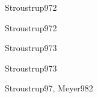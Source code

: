 \begin{syllabus}
\begin{unit}{\PFFOURDef}{Stroustrup97}{2}
\begin{learningoutcomes}
   \end{learningoutcomes}
\end{unit}

\begin{unit}{\PFFIVEDef}{Stroustrup97}{2}
   \PFFIVEAllTopics
   \PFFIVEAllObjectives
\end{unit}

\begin{unit}{\ALONEDef}{Stroustrup97}{3}
   \begin{topics}
      \item \ALONETopicAnalisis
      \item \ALONETopicIdentificar
   \end{topics}
   \begin{learningoutcomes}
      \item \ALONEObjTHREE
   \end{learningoutcomes}
\end{unit}

\begin{unit}{\ALTHREEDef}{Stroustrup97}{3}
   \begin{topics}
      \item \ALTHREETopicAlgoritmos
      \item \ALTHREETopicBusqueda
      \item \ALTHREETopicRepresentacion
      \item \ALTHREETopicOrdenamiento
   \end{topics}
   \begin{learningoutcomes}
      \item \ALTHREEObjONE
      \item \ALTHREEObjSIX
   \end{learningoutcomes}
\end{unit}
\begin{unit}{\PLTWODef}{Stroustrup97, Meyer98}{2}
   \begin{topics}
      \item \PLTWOTopicEl
      \item \PLTWOTopicLenguajes
      \item \PLTWOTopicTemas
   \end{topics}

   \begin{learningoutcomes}
      \item \PLTWOObjONE
      \item \PLTWOObjTWO
      \item \PLTWOObjTHREE
      \item \PLTWOObjTHREE
   \end{learningoutcomes}
\end{unit}


\end{syllabus}
